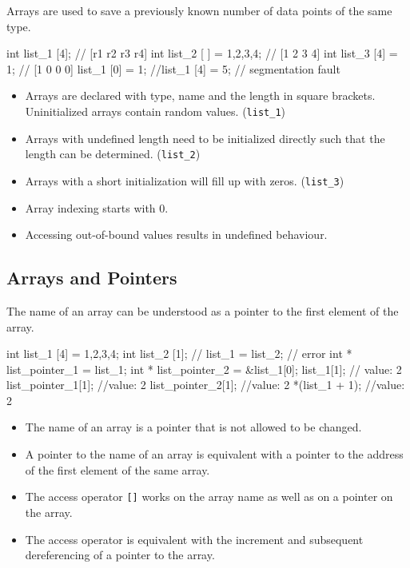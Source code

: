 \documentclass[10pt,a4paper]{scrartcl}
\begin{document}
\begin{multicols*}{2}
Arrays are used to save a previously known number of data points of the same type.

\begin{TPCpp}
int list_1 [4]; // [r1 r2 r3 r4]
int list_2 [ ] = {1,2,3,4}; // [1 2 3 4]
int list_3 [4] = {1}; // [1 0 0 0]
list_1 [0] = 1;
//list_1 [4] = 5; // segmentation fault
\end{TPCpp}

\begin{itemize}
\item Arrays are declared with type, name and the length in square brackets. Uninitialized arrays contain random values. (\verb+list_1+)
\item Arrays with undefined length need to be initialized directly such that the length can be determined. (\verb+list_2+)
\item Arrays with a short initialization will fill up with zeros. (\verb+list_3+)
\item Array indexing starts with 0.
\item Accessing out-of-bound values results in undefined behaviour.
\end{itemize}

\subsection{Arrays and Pointers}

The name of an array can be understood as a pointer to the first element of the array.

\begin{TPCpp}
int list_1 [4] = {1,2,3,4};
int list_2 [1];
// list_1 = list_2; // error
int * list_pointer_1 = list_1;
int * list_pointer_2 = &list_1[0];
list_1[1]; // value: 2
list_pointer_1[1]; //value: 2
list_pointer_2[1]; //value: 2
*(list_1 + 1); //value: 2
\end{TPCpp}

\begin{itemize}
\item The name of an array is a pointer that is not allowed to be changed.
\item A pointer to the name of an array is equivalent with a pointer to the address of the first element of the same array.
\item The access operator \verb+[]+ works on the array name as well as on a pointer on the array.
\item The access operator is equivalent with the increment and subsequent dereferencing of a pointer to the array.
\end{itemize}


\end{multicols*}
\end{document}
